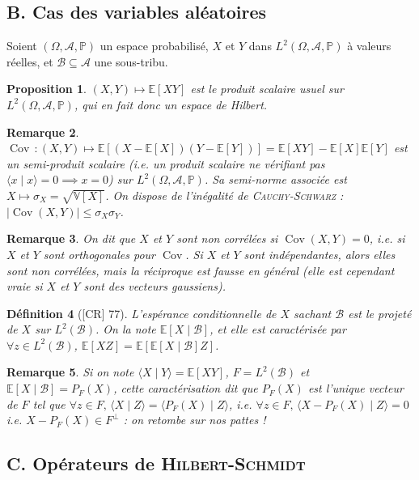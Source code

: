 \documentclass[10pt, a4paper, parskip=full, twoside, twocolumn]{report}
\newtheorem{definition}{Définition}
\newtheorem{proposition}[definition]{Proposition}
\newtheorem{remark}[definition]{Remarque}
\newcommand{\IP}{\mathbb{P}}
\newcommand{\IE}{\mathbb{E}}
\newcommand{\IV}{\mathbb{V}}
\newcommand{\B}{\mathcal{B}}
\newcommand{\A}{\mathcal{A}}
\newcommand{\ps}[2]{\langle #1\mid #2\rangle}
\DeclareMathOperator{\Cov}{Cov}
\begin{document}
\subsection*{B. Cas des variables aléatoires}

\textcolor{paragraphtext}{Soient $(\Omega, \A, \IP)$ un espace probabilisé, $X$ et $Y$ dans $L^2(\Omega, \A, \IP)$ à valeurs réelles, et $\B\subseteq \A$ une sous-tribu.}

\begin{proposition}
	$(X,Y)\mapsto \IE[XY]$ est le produit scalaire usuel sur $L^2(\Omega, \A,\IP)$, qui en fait donc un espace de Hilbert.
\end{proposition}

\begin{remark}
	$\Cov\,\colon (X,Y)\mapsto \IE\left[(X-\IE[X])(Y-\IE[Y])\right] = \IE[XY] - \IE[X]\IE[Y]$ est un semi-produit scalaire (\emph{i.e.} un produit scalaire ne vérifiant pas $\ps{x}{x} = 0 \implies x = 0$) sur $L^2(\Omega,\A,\IP)$.
	Sa semi-norme associée est $X \mapsto \sigma_X = \sqrt{\IV[X]}$. On dispose de l'inégalité de \textsc{Cauchy-Schwarz} : $\vert\Cov(X,Y)\vert \leq \sigma_X\sigma_Y$.
\end{remark}

\begin{remark}
	On dit que $X$ et $Y$ sont \emph{non corrélées} si $\Cov(X,Y) = 0$, \emph{i.e.} si $X$ et $Y$ sont orthogonales pour $\Cov$. Si $X$ et $Y$ sont indépendantes, alors elles sont non corrélées, mais la réciproque est fausse en général (elle est cependant vraie si $X$ et $Y$ sont des vecteurs gaussiens).
\end{remark}

\begin{definition}[\textnormal{[CR] 77}]
	L'\emph{espérance conditionnelle de $X$ sachant $\B$} est le projeté de $X$ sur $L^2(\B)$.
	On la note $\IE[X\mid \B]$, et elle est caractérisée par $\forall z\in L^2(\B)$, $\IE[XZ] = \IE\left[\IE[X\mid \B]Z\right]$.
\end{definition}

\begin{remark}
	Si on note $\ps{X}{Y}=\IE[XY]$, $F = L^2(\B)$ et $\IE[X\mid \B]=P_F(X)$, cette caractérisation dit que $P_F(X)$ est l'unique vecteur de $F$ tel que $\forall z\in F,\, \ps{X}{Z} = \ps{P_F(X)}{Z}$, \emph{i.e.} $\forall z\in F,\, \ps{X-P_F(X)}{Z}=0$ \emph{i.e.} $X -P_F(X)\in F^{\perp}$ : on retombe sur nos pattes !
\end{remark}

\subsection*{C. Opérateurs de \textsc{Hilbert-Schmidt}}
\end{document}
